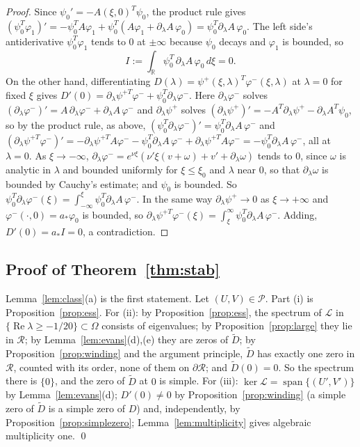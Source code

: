 \documentclass[11pt]{article}
\theoremstyle{definition}
\newcommand{\R}{\mathbb{R}}
\newcommand{\re}{\operatorname{Re}}
\newcommand{\Lop}{\mathcal{L}}
\newcommand{\Rbox}{\mathcal{R}}
\newcommand{\Pcl}{\mathcal{P}}
\begin{document}
\begin{proof}
Since $\psi_0' = -A(\xi, 0)^T\psi_0$, the product rule gives $(\psi_0^T\varphi_1)' = -\psi_0^TA\varphi_1 + \psi_0^T(A\varphi_1 + \partial_\lambda A\,\varphi_0) = \psi_0^T\partial_\lambda A\,\varphi_0$. The left side's antiderivative $\psi_0^T\varphi_1$ tends to $0$ at $\pm\infty$ because $\psi_0$ decays and $\varphi_1$ is bounded, so
\[
  I := \int_\R \psi_0^T\,\partial_\lambda A\,\varphi_0\, d\xi = 0 .
\]
On the other hand, differentiating $D(\lambda) = \psi^+(\xi, \lambda)^T\varphi^-(\xi, \lambda)$ at $\lambda = 0$ for fixed $\xi$ gives $D'(0) = \partial_\lambda\psi^{+T}\varphi^- + \psi_0^T\partial_\lambda\varphi^-$. Here $\partial_\lambda\varphi^-$ solves $(\partial_\lambda\varphi^-)' = A\,\partial_\lambda\varphi^- + \partial_\lambda A\,\varphi^-$ and $\partial_\lambda\psi^+$ solves $(\partial_\lambda\psi^+)' = -A^T\partial_\lambda\psi^+ - \partial_\lambda A^T\psi_0$, so by the product rule, as above, $(\psi_0^T\partial_\lambda\varphi^-)' = \psi_0^T\partial_\lambda A\,\varphi^-$ and $(\partial_\lambda\psi^{+T}\varphi^-)' = -\partial_\lambda\psi^{+T}A\varphi^- - \psi_0^T\partial_\lambda A\,\varphi^- + \partial_\lambda\psi^{+T}A\varphi^- = -\psi_0^T\partial_\lambda A\,\varphi^-$, all at $\lambda = 0$. As $\xi \to -\infty$, $\partial_\lambda\varphi^- = e^{\nu\xi}(\nu'\xi(v + \omega) + v' + \partial_\lambda\omega)$ tends to $0$, since $\omega$ is analytic in $\lambda$ and bounded uniformly for $\xi \le \xi_0$ and $\lambda$ near $0$, so that $\partial_\lambda\omega$ is bounded by Cauchy's estimate; and $\psi_0$ is bounded. So $\psi_0^T\partial_\lambda\varphi^-(\xi) = \int_{-\infty}^{\xi}\psi_0^T\partial_\lambda A\,\varphi^-$. In the same way $\partial_\lambda\psi^+ \to 0$ as $\xi \to +\infty$ and $\varphi^-(\cdot, 0) = a_*\varphi_0$ is bounded, so $\partial_\lambda\psi^{+T}\varphi^-(\xi) = \int_\xi^\infty\psi_0^T\partial_\lambda A\,\varphi^-$. Adding, $D'(0) = a_*I = 0$, a contradiction.
\end{proof}

\subsection{Proof of Theorem~\ref{thm:stab}}\label{sec:proof-stab}

Lemma~\ref{lem:class}(a) is the first statement. Let $(U, V) \in \Pcl$. Part (i) is Proposition~\ref{prop:ess}. For (ii): by Proposition~\ref{prop:ess}, the spectrum of $\Lop$ in $\{\re\lambda \ge -1/20\} \subset \Omega$ consists of eigenvalues; by Proposition~\ref{prop:large} they lie in $\Rbox$; by Lemma~\ref{lem:evans}(d),(e) they are zeros of $\tilde D$; by Proposition~\ref{prop:winding} and the argument principle, $\tilde D$ has exactly one zero in $\Rbox$, counted with its order, none of them on $\partial\Rbox$; and $\tilde D(0) = 0$. So the spectrum there is $\{0\}$, and the zero of $\tilde D$ at $0$ is simple. For (iii): $\ker\Lop = \operatorname{span}\{(U', V')\}$ by Lemma~\ref{lem:evans}(d); $D'(0) \ne 0$ by Proposition~\ref{prop:winding} (a simple zero of $\tilde D$ is a simple zero of $D$) and, independently, by Proposition~\ref{prop:simplezero}; Lemma~\ref{lem:multiplicity} gives algebraic multiplicity one. \qed
\end{document}
